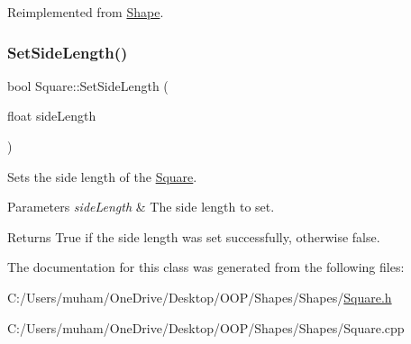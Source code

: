 Reimplemented from \mbox{\hyperlink{class_shape_a27f450f44fc4f9a444600b5df6754c5f}{Shape}}.

\mbox{\label{class_square_a2ca9671502705098ec6dac551d437ebe}} 
\subsubsection{\texorpdfstring{SetSideLength()}{SetSideLength()}}
{\footnotesize\ttfamily bool Square\+::\+Set\+Side\+Length (\begin{DoxyParamCaption}\item[{float}]{side\+Length }\end{DoxyParamCaption})}



Sets the side length of the \mbox{\hyperlink{class_square}{Square}}. 


\begin{DoxyParams}{Parameters}
{\em side\+Length} & The side length to set. \\
\hline
\end{DoxyParams}
\begin{DoxyReturn}{Returns}
True if the side length was set successfully, otherwise false. 
\end{DoxyReturn}


The documentation for this class was generated from the following files\+:\begin{DoxyCompactItemize}
\item 
C\+:/\+Users/muham/\+One\+Drive/\+Desktop/\+O\+O\+P/\+Shapes/\+Shapes/\mbox{\hyperlink{_square_8h}{Square.\+h}}\item 
C\+:/\+Users/muham/\+One\+Drive/\+Desktop/\+O\+O\+P/\+Shapes/\+Shapes/Square.\+cpp\end{DoxyCompactItemize}
